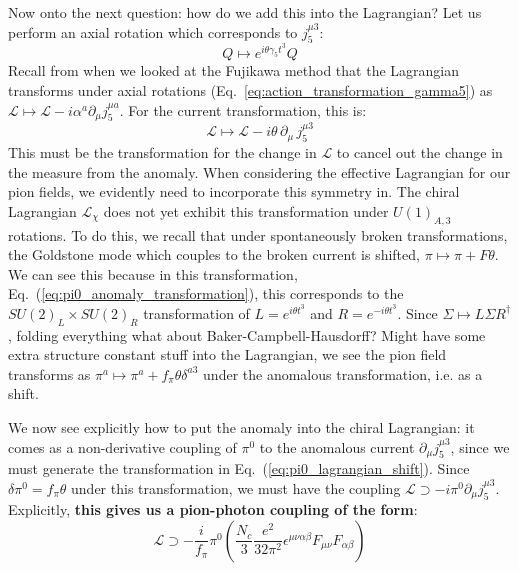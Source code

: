 \documentclass[11pt, oneside]{article}   	%
\theoremstyle{definition}
\numberwithin{equation}{subsection}		%
\begin{document}
Now onto the next question: how do we add this into the Lagrangian? Let us perform an axial rotation which corresponds to $j^{\mu 3}_5$:
\begin{equation}
	Q\mapsto e^{i\theta\gamma_5 t^3} Q
	\label{eq:pi0_anomaly_transformation}
\end{equation}
Recall from when we looked at the Fujikawa method that the Lagrangian transforms under axial 
rotations (Eq.~\ref{eq:action_transformation_gamma5}) as $\mathcal L\mapsto \mathcal L - i\alpha^a \partial_\mu j^{\mu a}_5$. For 
the current transformation, this is:
\begin{equation}
	\mathcal L\mapsto\mathcal L - i\theta\,\partial_\mu \,j_5^{\mu 3}
	\label{eq:pi0_lagrangian_shift}
\end{equation}
This must be the transformation for the change in $\mathcal L$ to cancel out the change in the measure from the anomaly. When 
considering the effective Lagrangian for our pion fields, we evidently need to incorporate this symmetry in. The chiral Lagrangian 
$\mathcal L_\chi$ does not yet exhibit this transformation under $U(1)_{A, 3}$ rotations. To do this, we recall that under 
spontaneously broken transformations, the Goldstone mode which couples to the broken current is shifted, $\pi\mapsto \pi + F\theta$. 
We can see this because in this transformation, Eq.~(\ref{eq:pi0_anomaly_transformation}), this corresponds to the $SU(2)_L\times 
SU(2)_R$ transformation of $L = e^{i\theta t^3}$ and $R = e^{-i\theta t^3}$. Since $\Sigma\mapsto L\Sigma R^\dagger$, 
folding everything {\color{red} what about Baker-Campbell-Hausdorff? Might have some extra structure constant stuff} into the Lagrangian, 
we see the pion field transforms as $\pi^a\mapsto \pi^a + f_\pi\theta\delta^{a3}$ under the anomalous transformation, i.e. as a shift. 

We now see explicitly how to put the anomaly into the chiral Lagrangian: it comes as a non-derivative coupling of $\pi^0$ to the anomalous 
current $\partial_\mu j^{\mu 3}_5$, since we must generate the transformation in Eq.~(\ref{eq:pi0_lagrangian_shift}). Since $\delta\pi^0 = 
f_\pi\theta$ under this transformation, we must have the coupling $\mathcal L\supset -i \pi^0\partial_\mu j_5^{\mu 3}$. Explicitly, \textbf{this 
gives us a pion-photon coupling of the form}:
\begin{equation}
	\mathcal L\supset -\frac{i}{f_\pi}\pi^0\left(\frac{N_c}{3} \frac{e^2}{32\pi^2}\epsilon^{\mu\nu\alpha\beta} F_{\mu\nu} F_{\alpha\beta}\right)
\end{equation}
\end{document}
